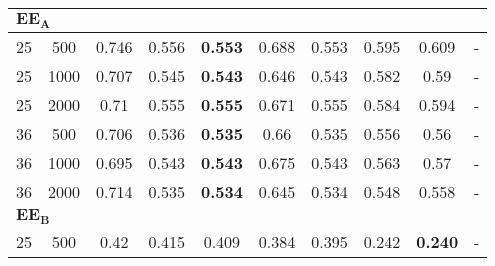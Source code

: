 \begin{landscape}
\begin{table}[!h]
\begin{tabular}{cccccccccc}
	\hline
	\multicolumn{10}{l}{$\mathbf{EE_A}$} \\
	\hline
	 25  & 500  &         0.746         &                 0.556                 & \textbf{0.553}                                   &                     0.688                      &                      0.553                       &          0.595           &           0.609            & -                 \\
	 25  & 1000 &         0.707         &                 0.545                 & \textbf{0.543}                                   &                     0.646                      &                      0.543                       &          0.582           &            0.59            & -                 \\
	 25  & 2000 &         0.71          &                 0.555                 & \textbf{0.555}                                   &                     0.671                      &                      0.555                       &          0.584           &           0.594            & -                 \\
	 36  & 500  &         0.706         &                 0.536                 & \textbf{0.535}                                   &                      0.66                      &                      0.535                       &          0.556           &            0.56            & -                 \\
	 36  & 1000 &         0.695         &                 0.543                 & \textbf{0.543}                                   &                     0.675                      &                      0.543                       &          0.563           &            0.57            & -                 \\
	 36  & 2000 &         0.714         &                 0.535                 & \textbf{0.534}                                   &                     0.645                      &                      0.534                       &          0.548           &           0.558            & -                 \\
	\hline
	\multicolumn{10}{l}{$\mathbf{EE_B}$} \\
	\hline
	 25  & 500  &         0.42          &                 0.415                 &                      0.409                       &                     0.384                      &                      0.395                       &          0.242           & \textbf{0.240}             & -                 \\

\end{tabular}
\end{table}
\end{landscape}

